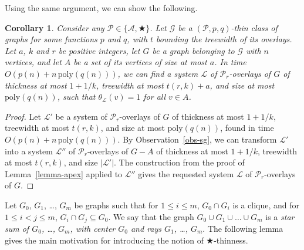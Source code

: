 \documentclass[a4paper,11pt]{article}
\newcommand{\Aa}{{\mathcal A}}
\newcommand{\GG}{{\mathcal G}}
\newcommand{\LL}{{\mathcal L}}
\newcommand{\PP}{{\mathcal P}}
\newcommand{\poly}{\text{poly}}
\newtheorem{corollary}[theorem]{Corollary}
\begin{document}
Using the same argument, we can show the following.

\begin{corollary}\label{cor-root}
Consider any $\PP\in\{\Aa,\bigstar\}$.
Let $\GG$ be a $(\PP,p,q)$-thin class of graphs for some functions $p$ and $q$, with $t$ bounding the treewidth of its overlays.
Let $a$, $k$ and $r$ be positive integers, let $G$ be a graph belonging to $\GG$ with $n$ vertices,
and let $A$ be a set of its vertices of size at most $a$.  In time $O(p(n)+n\,\poly(q(n)))$, we can find a system $\LL$ of $\PP_r$-overlays of $G$
of thickness at most $1+1/k$, treewidth at most $t(r,k)+a$, and size at most $\poly(q(n))$, such that $\theta_\LL(v)=1$ for all $v\in A$.
\end{corollary}
\begin{proof}
Let $\LL'$ be a system of $\PP_r$-overlays of $G$ of thickness at most $1+1/k$,
treewidth at most $t(r,k)$, and size at most $\poly(q(n))$, found in time $O(p(n)+n\,\poly(q(n)))$.
By Observation~\ref{obs-sg}, we can transform $\LL'$ into a system $\LL''$ of $\PP_r$-overlays of $G-A$
of thickness at most $1+1/k$, treewidth at most $t(r,k)$, and size $|\LL'|$.  The construction from the proof of Lemma~\ref{lemma-apex}
applied to $\LL''$ gives the requested system $\LL$ of $\PP_r$-overlays of $G$.
\end{proof}

Let $G_0$, $G_1$, \ldots, $G_m$ be graphs such that for $1\le i\le m$, $G_0\cap G_i$ is a clique,
and for $1\le i<j\le m$, $G_i\cap G_j\subseteq G_0$.  We say that the graph $G_0\cup G_1\cup\ldots\cup G_m$
is a \emph{star sum of $G_0$, \ldots, $G_m$, with center $G_0$ and rays $G_1$, \ldots, $G_m$}.
The following lemma gives the main motivation for introducing the notion of $\bigstar$-thinness.
\end{document}
